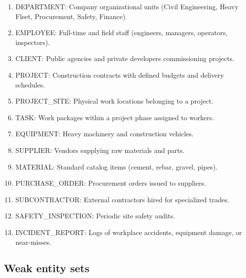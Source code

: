 \documentclass[a4paper,12pt]{report}
\providecommand{\tightlist}{%
  \setlength{\itemsep}{0pt}\setlength{\parskip}{0pt}}
\begin{document}
\begin{enumerate}
\def\labelenumi{\arabic{enumi}.}
\tightlist
\item
  DEPARTMENT: Company organizational units (\allowbreak{}Civil Engineering, Heavy Fleet, Procurement, Safety, Finance).
\item
  EMPLOYEE: Full-time and field staff (\allowbreak{}engineers, managers, operators, inspectors).
\item
  CLIENT: Public agencies and private developers commissioning projects.
\item
  PROJECT: Construction contracts with defined budgets and delivery schedules.
\item
  PROJECT\_\allowbreak{}SITE: Physical work locations belonging to a project.
\item
  TASK: Work packages within a project phase assigned to workers.
\item
  EQUIPMENT: Heavy machinery and construction vehicles.
\item
  SUPPLIER: Vendors supplying raw materials and parts.
\item
  MATERIAL: Standard catalog items (\allowbreak{}cement, rebar, gravel, pipes).
\item
  PURCHASE\_\allowbreak{}ORDER: Procurement orders issued to suppliers.
\item
  SUBCONTRACTOR: External contractors hired for specialized trades.
\item
  SAFETY\_\allowbreak{}INSPECTION: Periodic site safety audits.
\item
  INCIDENT\_\allowbreak{}REPORT: Logs of workplace accidents, equipment damage, or near-misses.
\end{enumerate}

\subsection{Weak entity sets}\label{weak-entity-sets}
\end{document}
